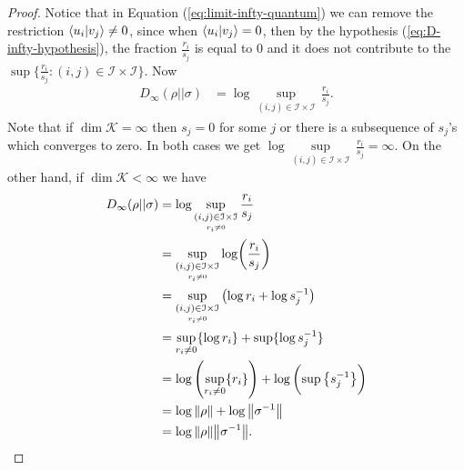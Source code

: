 \documentclass[12pt,a4paper,oneside]{article}
\numberwithin{equation}{section}
\theoremstyle{definition}  %
\theoremstyle{plain}  %
\theoremstyle{remark} %
\newcommand{\CK}{\mathcal{K}}
\begin{document}
 \begin{proof}
 Notice that in Equation (\ref{eq:limit-infty-quantum}) we can  remove the restriction
 $\braket{u_i}{v_j} \not = 0$, since when $\braket{u_i}{v_j} = 0$, then by the hypothesis (\ref{eq:D-infty-hypothesis}), the fraction $\frac{r_i}{s_j}$ is equal to $0$ and it does
 not contribute to the $\sup \{ \frac{r_i}{s_j}: (i,j) \in \mathcal{I}\times \mathcal{I}\}$. Now
 \begin{align*}
   D_{\infty}(\rho||\sigma)&= \log \underset{\underset{}{(i,j)\in \mathcal{I}\times \mathcal{I}}}{\sup}\,\frac{r_i }{s_j}.
   \end{align*}
   Note that if $\dim \CK = \infty$ then $s_j=0$ for some $j$ or there is a subsequence of $s_j$'s which converges to zero. In both cases we get $\log \underset{\underset{}{(i,j)\in \mathcal{I}\times \mathcal{I}}}{\sup}\,\frac{r_i }{s_j} = \infty$. On the other hand, if $\dim \CK <\infty$ we have 
   \begin{align*}
   D_{\infty}(\rho||\sigma)&= \log \underset{\underset{r_i\neq0}{(i,j)\in \mathcal{I}\times \mathcal{I}}}{\sup}\,\frac{r_i }{s_j}\\
   &=  \underset{\underset{r_i\neq0}{(i,j)\in \mathcal{I}\times \mathcal{I}}}{\sup} \log (\frac{r_i}{s_j})\\
   &=  \underset{\underset{r_i\neq0}{(i,j)\in \mathcal{I}\times \mathcal{I}}}{\sup} \left(\log r_i+\log{{s_j^{-1}}}\right) \\
   &= \underset{r_i\neq0}{\sup} \{\log r_i\} +\underset{}{\sup} \{\log {s_j^{-1}}\}\\
   &=\log \left(\underset{r_i\neq0}{\sup} \{r_i\}\right)+\log\left( \underset{}{\sup} \left\{{s_j^{-1}}\right\}\right)\\
   &= \log \norm{\rho} +\log \norm{\sigma^{-1}}\\
   &= \log \norm{\rho}\norm{\sigma^{-1}}.
 \end{align*} 
 \end{proof}
\end{document}
